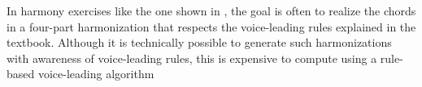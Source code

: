 
In harmony exercises like the one shown in
, the goal is often to
\gls{realize} the chords in a four-part harmonization that
respects the voice-leading rules explained in the textbook.
Although it is technically possible to generate such
harmonizations with awareness of  voice-leading rules, this
is expensive to compute using a rule-based voice-leading
algorithm 
